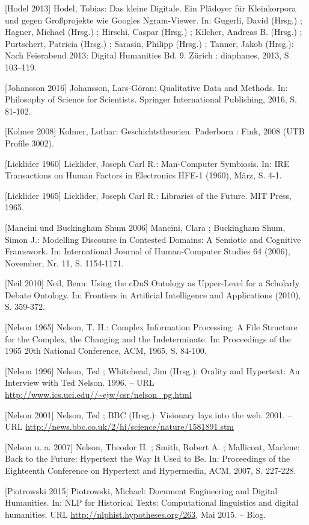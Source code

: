 \documentclass[a4paper,
fontsize=11pt,
oneside,
numbers=noperiodatend,
parskip=half-,
bibliography=totoc,
final
]{scrartcl}
\begin{document}
{[}Hodel 2013{]} Hodel, Tobias: Das kleine Digitale. Ein Plädoyer für
Kleinkorpora und gegen Großprojekte wie Googles Ngram-Viewer. In:
Gugerli, David (Hrsg.) ; Hagner, Michael (Hrsg.) ; Hirschi, Caspar
(Hrsg.) ; Kilcher, Andreas B. (Hrsg.) ; Purtschert, Patricia (Hrsg.) ;
Sarasin, Philipp (Hrsg.) ; Tanner, Jakob (Hrsg.): Nach Feierabend 2013:
Digital Humanities Bd. 9. Zürich : diaphanes, 2013, S. 103--119.

{[}Johansson 2016{]} Johansson, Lars-Göran: Qualitative Data and
Methods. In: Philosophy of Science for Scientists. Springer
International Publishing, 2016, S. 81-102.

{[}Kolmer 2008{]} Kolmer, Lothar: Geschichtstheorien. Paderborn : Fink,
2008 (UTB Profile 3002).

{[}Licklider 1960{]} Licklider, Joseph Carl R.: Man-Computer Symbiosis.
In: IRE Transactions on Human Factors in Electronics HFE-1 (1960), März,
S. 4-1.

{[}Licklider 1965{]} Licklider, Joseph Carl R.: Libraries of the Future.
MIT Press, 1965.

{[}Mancini und Buckingham Shum 2006{]} Mancini, Clara ; Buckingham Shum,
Simon J.: Modelling Discourse in Contested Domains: A Semiotic and
Cognitive Framework. In: International Journal of Human-Computer Studies
64 (2006), November, Nr. 11, S. 1154-1171.

{[}Neil 2010{]} Neil, Benn: Using the cDnS Ontology as Upper-Level for a
Scholarly Debate Ontology. In: Frontiers in Artificial Intelligence and
Applications (2010), S. 359-372.

{[}Nelson 1965{]} Nelson, T. H.: Complex Information Processing: A File
Structure for the Complex, the Changing and the Indeterminate. In:
Proceedings of the 1965 20th National Conference, ACM, 1965, S. 84-100.

{[}Nelson 1996{]} Nelson, Ted ; Whitehead, Jim (Hrsg.): Orality and
Hypertext: An Interview with Ted Nelson. 1996. -- URL
\url{http://www.ics.uci.edu//~ejw/csr/nelson_pg.html}

{[}Nelson 2001{]} Nelson, Ted ; BBC (Hrsg.): Visionary lays into the
web. 2001. -- URL
\url{http://news.bbc.co.uk/2/hi/science/nature/1581891.stm}

{[}Nelson u. a. 2007{]} Nelson, Theodor H. ; Smith, Robert A. ;
Mallicoat, Marlene: Back to the Future: Hypertext the Way It Used to Be.
In: Proceedings of the Eighteenth Conference on Hypertext and
Hypermedia, ACM, 2007, S. 227-228.

{[}Piotrowski 2015{]} Piotrowski, Michael: Document Engineering and
Digital Humanities. In: NLP for Historical Texts: Computational
linguistics and digital humanities. URL
\url{http://nlphist.hypotheses.org/263}, Mai 2015. -- Blog.
\end{document}

